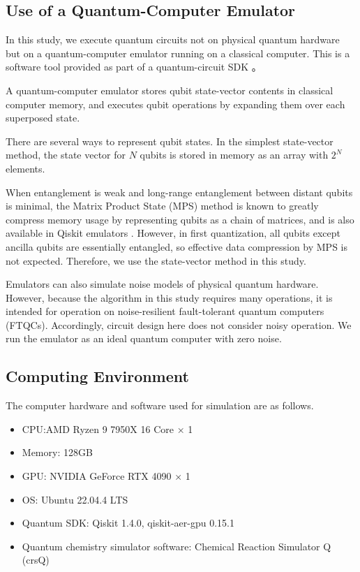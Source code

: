 \documentclass[a4paper,11pt]{article}
\begin{document}
\subsection{Use of a Quantum-Computer Emulator}
In this study, we execute quantum circuits not on physical quantum hardware but
on a quantum-computer emulator running on a classical computer. This is a
software tool provided as part of a quantum-circuit SDK
\cite{website:qiskit-aer}。

A quantum-computer emulator stores qubit state-vector contents in classical
computer memory, and executes qubit operations by expanding them over each
superposed state.

There are several ways to represent qubit states. In the simplest state-vector
method, the state vector for $N$ qubits is stored in memory as an array with
$2^N$ elements.

When entanglement is weak and long-range entanglement between distant qubits is
minimal, the Matrix Product State (MPS) method is known to greatly compress
memory usage by representing qubits as a chain of matrices, and is also
available in Qiskit emulators \cite{Vidal2003.PhysRevLett.91.147902}. However,
in first quantization, all qubits except ancilla qubits are essentially
entangled, so effective data compression by MPS is not expected. Therefore, we
use the state-vector method in this study.

Emulators can also simulate noise models of physical quantum hardware. However,
because the algorithm in this study requires many operations, it is intended
for operation on noise-resilient fault-tolerant quantum computers (FTQCs).
Accordingly, circuit design here does not consider noisy operation. We run the
emulator as an ideal quantum computer with zero noise.


\subsection{Computing Environment}
The computer hardware and software used for simulation are as follows.
\begin{itemize}
    \item CPU:AMD Ryzen 9 7950X 16 Core × 1
    \item Memory: 128GB
    \item GPU: NVIDIA GeForce RTX 4090 × 1
    \item OS: Ubuntu 22.04.4 LTS
    \item Quantum SDK: Qiskit 1.4.0, qiskit-aer-gpu 0.15.1
    \item Quantum chemistry simulator software: Chemical Reaction Simulator Q (crsQ) \cite{website:crsq}
\end{itemize}
\end{document}
